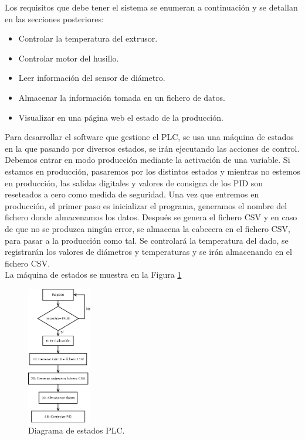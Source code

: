 Los requisitos que debe tener el sistema se enumeran a continuación y se detallan en las secciones posteriores:

\begin{itemize}
    \item{Controlar la temperatura del extrusor.}
    \item{Controlar motor del husillo.}
    \item{Leer información del sensor de diámetro.}
    \item{Almacenar la información tomada en un fichero de datos.}
    \item{Visualizar en una página web el estado de la producción.}
\end{itemize}

Para desarrollar el software que gestione el PLC, se usa una máquina de estados en la que pasando por diversos estados, se irán ejecutando las acciones de control. Debemos entrar en modo producción mediante la activación de una variable. Si estamos en producción, pasaremos por los distintos estados y mientras no estemos en producción, las salidas digitales y valores de consigna de los PID son reseteados a cero como medida de seguridad. Una vez que entremos en producción, el primer paso es inicializar el programa, generamos el nombre del fichero donde almacenamos los datos. Después se genera el fichero CSV y en caso de que no se produzca ningún error, se almacena la cabecera en el fichero CSV, para pasar a la producción como tal. Se controlará la temperatura del dado, se registrarán los valores de diámetros y temperaturas y se irán almacenando en el fichero CSV.\\

La máquina de estados se muestra en la Figura \ref{fig:plc_estados}

\begin{figure}[H]
    \centering
    \includegraphics[width=0.25\textwidth]{images/PLC/diagrama.png}
    \caption[Diagrama de estados PLC.]{Diagrama de estados PLC.}
    \label{fig:plc_estados}
\end{figure}

